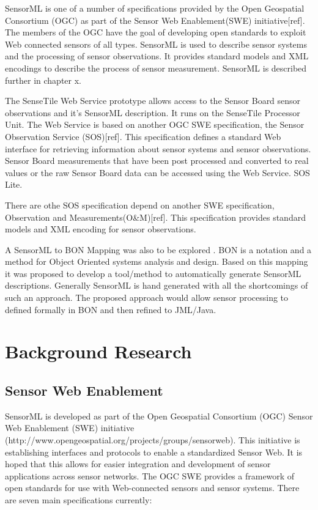 \documentclass[]{final_report}
\begin{document}
SensorML is one of a number of specifications provided by the Open Geospatial Consortium (OGC) as part of the Sensor Web Enablement(SWE) initiative[ref]. The members of the OGC have the goal of developing open standards to exploit Web connected sensors of all types. SensorML is used to describe sensor systems and the processing of sensor observations. It provides standard models and XML encodings to describe the process of sensor measurement. SensorML is described further in chapter x.

The SenseTile Web Service prototype allows access to the Sensor Board sensor observations and it's SensorML description. It runs on the SenseTile Processor Unit.  The Web Service is based on another OGC SWE  specification, the Sensor Observation Service (SOS)[ref]. This specification defines a standard Web interface for retrieving information about sensor systems and sensor observations. Sensor Board measurements that have been post processed and converted to real values or the raw Sensor Board data can be accessed using the Web Service. SOS Lite.

There are othe  SOS specification depend on another SWE specification, Observation and Measurements(O\&M)[ref]. This specification provides standard models and XML encoding for sensor observations.

A  SensorML to BON Mapping was also to be explored . BON\cite{BONref} is a notation and a method for Object Oriented systems analysis and design. Based on this mapping it was proposed to develop a tool/method to automatically generate SensorML descriptions. Generally SensorML is hand generated with all the shortcomings of such an approach. The proposed approach would allow sensor processing to defined formally in BON and then refined to JML/Java. 


\chapter{ Background Research}

\section{Sensor Web Enablement}
SensorML is developed as part of the Open Geospatial Consortium (OGC) Sensor Web Enablement (SWE) initiative (http://www.opengeospatial.org/projects/groups/sensorweb). This initiative is establishing interfaces and protocols to enable a standardized Sensor Web. It is hoped that this allows for easier integration and development of sensor applications across sensor networks. The OGC SWE provides a framework of open standards for use with Web-connected sensors and sensor systems. There are seven main specifications currently:
\end{document}
